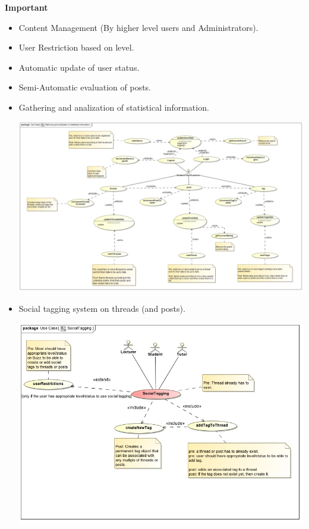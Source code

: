 \documentclass[a4paper,12pt]{report}
\begin{document}
\textbf{Important} 
\begin{itemize}
  \item Content Management (By higher level users and Administrators).
  \item User Restriction based on level.
  \item Automatic update of user status.
  \item Semi-Automatic evaluation of posts.
  \item Gathering and analization of statistical information.
	\begin{center}
  	\includegraphics[width=1\textwidth]{../Functional_Requirements_DIagrams/UseCases/UseCase_StatisticalInformation.jpg}\\[0.4cm]    
	\end{center}
  \item Social tagging system on threads (and posts).
	\begin{center}
  	\includegraphics[width=1\textwidth]{../Functional_Requirements_DIagrams/UseCases/UseCase_SocialTagging.jpg}\\[0.4cm]    

\end{center}
\end{itemize}
\end{document}
